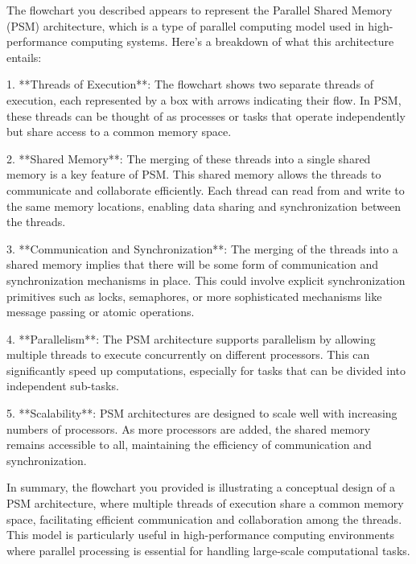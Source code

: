 The flowchart you described appears to represent the Parallel Shared Memory (PSM) architecture, which is a type of parallel computing model used in high-performance computing systems. Here's a breakdown of what this architecture entails:

1. **Threads of Execution**: The flowchart shows two separate threads of execution, each represented by a box with arrows indicating their flow. In PSM, these threads can be thought of as processes or tasks that operate independently but share access to a common memory space.

2. **Shared Memory**: The merging of these threads into a single shared memory is a key feature of PSM. This shared memory allows the threads to communicate and collaborate efficiently. Each thread can read from and write to the same memory locations, enabling data sharing and synchronization between the threads.

3. **Communication and Synchronization**: The merging of the threads into a shared memory implies that there will be some form of communication and synchronization mechanisms in place. This could involve explicit synchronization primitives such as locks, semaphores, or more sophisticated mechanisms like message passing or atomic operations.

4. **Parallelism**: The PSM architecture supports parallelism by allowing multiple threads to execute concurrently on different processors. This can significantly speed up computations, especially for tasks that can be divided into independent sub-tasks.

5. **Scalability**: PSM architectures are designed to scale well with increasing numbers of processors. As more processors are added, the shared memory remains accessible to all, maintaining the efficiency of communication and synchronization.

In summary, the flowchart you provided is illustrating a conceptual design of a PSM architecture, where multiple threads of execution share a common memory space, facilitating efficient communication and collaboration among the threads. This model is particularly useful in high-performance computing environments where parallel processing is essential for handling large-scale computational tasks.